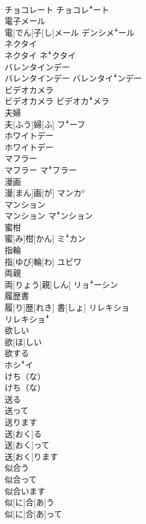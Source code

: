 \documentclass[8pt]{extreport}
\begin{document}
\begin{CJK}{UTF8}{min}
\\	チョコレート	チョコレꜜート
\\	電子メール	
\\	電[でん]子[し]メール	デンシメꜜール
\\	ネクタイ	
\\	ネクタイ	ネꜜクタイ
\\	バレンタインデー	
\\	バレンタインデー	バレンタイꜜンデー
\\	ビデオカメラ	
\\	ビデオカメラ	ビデオカꜜメラ
\\	夫婦	
\\	夫[ふう]婦[ふ]	フꜜーフ
\\	ホワイトデー	
\\	ホワイトデー	
\\	マフラー	
\\	マフラー	マꜜフラー
\\	漫画	
\\	漫[まん]画[が]	マンカ°
\\	マンション	
\\	マンション	マꜜンション
\\	蜜柑	
\\	蜜[み]柑[かん]	ミꜜカン
\\	指輪	
\\	指[ゆび]輪[わ]	ユビワ
\\	両親	
\\	両[りょう]親[しん]	リョꜜーシン
\\	履歴書	
\\	履[り]歴[れき] 書[しょ]	リレキショ 
\\	リレキショꜜ
\\	欲しい	
\\	欲[ほ]しい 
\\	欲する 
\\	ホシꜜイ
\\	けち（な）	
\\	けち（な）	
\\	送る 
\\	送って 
\\	送ります	
\\	送[おく]る 
\\	送[おく]って 
\\	送[おく]ります	
\\	似合う 
\\	似合って 
\\	似合います	
\\	似[に]合[あ]う 
\\	似[に]合[あ]って 

\end{CJK}
\end{document}
